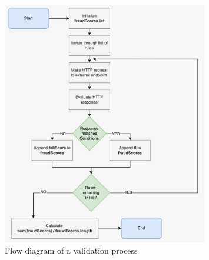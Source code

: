   \begin{figure}[!ht]
    \centering
    \includegraphics[width=0.8\textwidth]{diagrams/flow_validation_process.jpeg}
    \caption{Flow diagram of a validation process}
    \label{fig:flow_validation}
  \end{figure}
  
\newpage
\thispagestyle{empty}      
\noindent

\newpage
